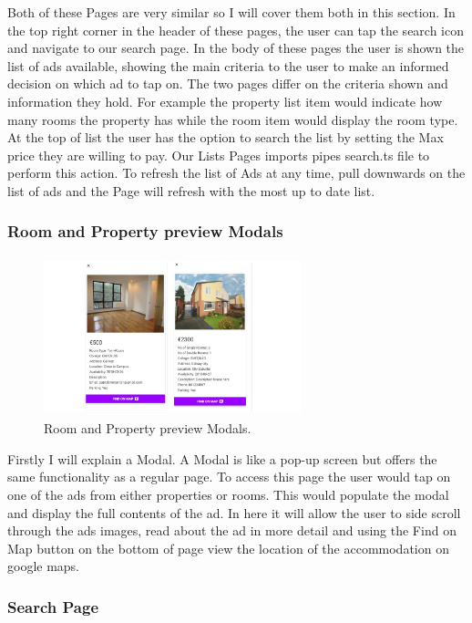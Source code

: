 \noindent Both of these Pages are very similar so I will cover them both in this section. In the top right corner in the header of these pages, the user can tap the search icon and navigate to our search page. In the body of these pages the user is shown the list of ads available, showing the main criteria to the user to make an informed decision on which ad to tap on. The two pages differ on the criteria shown and information they hold. For example the property list item would indicate how many rooms the property has while the room item would display the room type. At the top of list the user has the option to search the list by setting the Max price they are willing to pay. Our Lists Pages imports pipes search.ts file to perform this action. To refresh the list of Ads at any time, pull downwards on the list of ads and the Page will refresh with the most up to date list.

\subsubsection{Room and Property preview Modals}

\begin{figure}[h]
\centering
\includegraphics[width=7.5cm, height=4.6cm]{img/Modals}
\caption{Room and Property preview Modals.}
\end{figure}  

\noindent Firstly I will explain a Modal. A Modal is like a pop-up screen but offers the same functionality as a regular page. To access this page the user would tap on one of the ads from either properties or rooms. This would populate the modal and display the full contents of the ad. In here it will allow the user to side scroll through the ads images, read about the ad in more detail and using the Find on Map button on the bottom of page view the location of the accommodation on google maps.

\subsubsection{Search Page}

